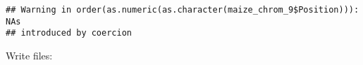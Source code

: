 \documentclass[]{article}
\newenvironment{Shaded}{\begin{snugshade}}{\end{snugshade}}
\newcommand{\DecValTok}[1]{\textcolor[rgb]{0.00,0.00,0.81}{#1}}
\newcommand{\KeywordTok}[1]{\textcolor[rgb]{0.13,0.29,0.53}{\textbf{#1}}}
\newcommand{\NormalTok}[1]{#1}
\newcommand{\OperatorTok}[1]{\textcolor[rgb]{0.81,0.36,0.00}{\textbf{#1}}}
\newcommand{\StringTok}[1]{\textcolor[rgb]{0.31,0.60,0.02}{#1}}
\begin{document}
\begin{verbatim}
## Warning in order(as.numeric(as.character(maize_chrom_9$Position))): NAs
## introduced by coercion
\end{verbatim}

\begin{Shaded}
\end{Shaded}

Write files:
\end{document}
